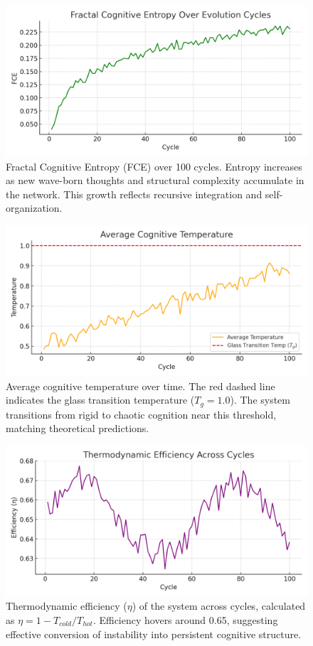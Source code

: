 \documentclass{article}
\begin{document}
\begin{figure}[!htbp]
\centering
\includegraphics[width=0.85\linewidth]{figures/fce_growth.png}
\caption{Fractal Cognitive Entropy (FCE) over 100 cycles. Entropy increases as new wave-born thoughts and structural complexity accumulate in the network. This growth reflects recursive integration and self-organization.}
\label{fig:fce_growth}
\end{figure}

\begin{figure}[!htbp]
\centering
\includegraphics[width=0.85\linewidth]{figures/phase_diagram.png}
\caption{Average cognitive temperature over time. The red dashed line indicates the glass transition temperature ($T_g = 1.0$). The system transitions from rigid to chaotic cognition near this threshold, matching theoretical predictions.}
\label{fig:phase_diagram}
\end{figure}

\begin{figure}[!htpb]
\centering
\includegraphics[width=0.85\linewidth]{figures/thermodynamic_efficiency.png}
\caption{Thermodynamic efficiency ($\eta$) of the system across cycles, calculated as $\eta = 1 - T_{cold} / T_{hot}$. Efficiency hovers around 0.65, suggesting effective conversion of instability into persistent cognitive structure.}
\label{fig:efficiency}
\end{figure}
\end{document}
